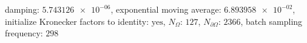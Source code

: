 damping: $\num[scientific-notation=true]{5.743126e-06}$, exponential moving average: $\num[scientific-notation=true]{6.893958e-02}$, initialize Kronecker factors to identity: $\text{yes}$, $N_{\Omega}$: $\num[scientific-notation=false]{127}$, $N_{\partial\Omega}$: $\num[scientific-notation=false]{2366}$, batch sampling frequency: $\num[scientific-notation=false]{298}$